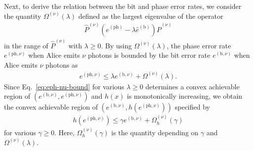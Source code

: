 \documentclass[twocolumn,superscriptaddress,pra,footinbib,notitlepage]{revtex4-1}
\newcommand{\1}{\mbox{1}\hspace{-0.25em}\mbox{l}}
\begin{document}
Next, to derive the relation between the bit and phase error rates, we consider the quantity $\Omega^{(\nu)}(\lambda)$ defined as the largest eigenvalue of the operator
\begin{align}
\hat{P}^{(\nu)}\left(\hat{e}^{(\textrm{ph})}-\lambda\hat{e}^{(\textrm{b})}\right)\hat{P}^{(\nu)}\label{eq:relation-ebit-eph-POVM}
\end{align}
in the range of $\hat{P}^{(\nu)}$ with $\lambda\geq0$. By using $\Omega^{(\nu)}(\lambda)$, the phase error rate $e^{(\textrm{ph}, \nu)}$ when Alice emits $\nu$ photons is bounded by the bit error rate $e^{(\textrm{b}, \nu)}$ when Alice emits $\nu$ photons as~\cite{tamaki2012unconditional}
\begin{align}
e^{(\textrm{ph}, \nu)}\leq\lambda e^{(\textrm{b}, \nu)}+\Omega^{(\nu)}(\lambda).\label{eq:eph-nu-bound}
\end{align}
Since Eq.~\eqref{eq:eph-nu-bound} for various $\lambda\geq0$ determines a convex achievable region of $(e^{(\textrm{b}, \nu)}, e^{(\textrm{ph}, \nu)})$ and $h(x)$ is monotonically increasing, we obtain the convex achievable region of $(e^{(\textrm{b}, \nu)}, h(e^{(\textrm{ph}, \nu)}))$ specified by
\begin{align}
h(e^{(\textrm{ph}, \nu)})\leq\gamma e^{(\textrm{b}, \nu)}+\Omega_h^{(\nu)}(\gamma)\label{eq:heph-nu-bound}
\end{align}
for various $\gamma\geq0$. Here, $\Omega_h^{(\nu)}(\gamma)$ is the quantity depending on $\gamma$ and $\Omega^{(\nu)}(\lambda)$.
\end{document}

